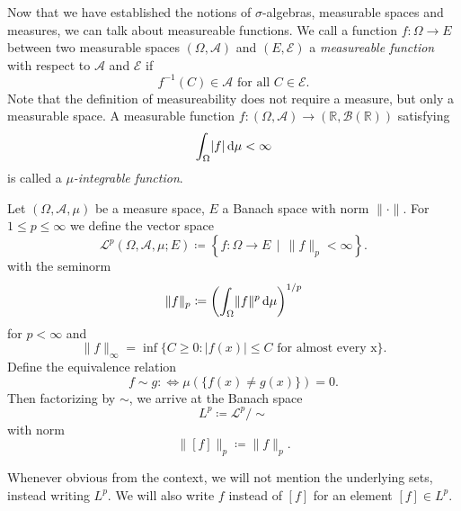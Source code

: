 


Now that we have established the notions of $\sigma$-algebras, measurable spaces and measures, we can talk about measureable functions. 
We call a function \( f \colon \Omega \to E \) between two measurable spaces \( (\Omega,\mathcal{A}) \) and \( (E,\mathcal{E}) \) a \textit{measureable function} with respect to $\mathcal{A}$ and $\mathcal{E}$ if 
\[ f^{-1}(C) \in \mathcal{A}  \text{ for all } C \in \mathcal{E}. \] 
Note that the definition of measureability does not require a measure, but only a measurable space. 
A measurable function \( f \colon (\Omega,\mathcal{A}) \to (\mathbb{R}, \mathcal{B}(\mathbb{R})) \) satisfying
\[
    \int_{\Omega} \lvert f \rvert \dx[\mu] < \infty
\]
is called a \textit{$\mu$-integrable function}.





\begin{definition}
    Let \((\Omega, \mathcal{A}, \mu)\) be a measure space, $E$ a Banach space with norm \( \lVert \cdot \rVert \). For \( 1 \leq p \leq \infty \) we define
    the vector space
    \[
        \mathcal{L}^{p}(\Omega,\mathcal{A}, \mu; E) \coloneqq \left\{ f \colon \Omega \to E \,\mid\, \lVert f \rVert_{p} < \infty \right\}.
    \] 
    with the seminorm
    \[
        \lVert f \rVert_{p} \coloneqq \left( \int_{\Omega} \lVert f \rVert^{p} \dx[\mu] \right)^{1/p}
    \]
    for \( p < \infty \) and
    \[
        \lVert f \rVert_{\infty} = \inf \{ C \geq 0 : \lvert f(x) \rvert \leq C \text{ for almost every x} \}.
    \]
    Define the equivalence relation
    \[
        f \sim g \colon \iff \mu(\{f(x) \neq g(x)\}) = 0.
    \]
    Then factorizing by $\sim$, we arrive at the Banach space 
    \[
        L^{p} \coloneqq \mathcal{L}^{p} / \sim
    \]
    with norm
    \[
        \lVert [f] \rVert_{p} \coloneqq \lVert f \rVert_{p}.
    \]
\end{definition}
Whenever obvious from the context, we will not mention the underlying sets, instead writing \( L^{p} \). We will also write $f$ instead of \([f]\)  for an element \([f] \in L^{p} \).



